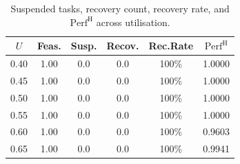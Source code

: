 \begin{table}[htbp]
  \centering
  \caption{Suspended tasks, recovery count, recovery rate, and $\mathrm{Perf}^{\mathrm{H}}$ across utilisation.}
  \label{tab:suspend_recovery}
  \begin{tabular}{cccccc}
    \toprule
    $U$ & Feas. & Susp. & Recov. & Rec.Rate & $\mathrm{Perf}^{\mathrm{H}}$ \\
    \midrule
    0.40 & 1.00 & 0.0 & 0.0 & 100\% & 1.0000 \\
    0.45 & 1.00 & 0.0 & 0.0 & 100\% & 1.0000 \\
    0.50 & 1.00 & 0.0 & 0.0 & 100\% & 1.0000 \\
    0.55 & 1.00 & 0.0 & 0.0 & 100\% & 1.0000 \\
    0.60 & 1.00 & 0.0 & 0.0 & 100\% & 0.9603 \\
    0.65 & 1.00 & 0.0 & 0.0 & 100\% & 0.9941 \\
    \bottomrule
  \end{tabular}
\end{table}
